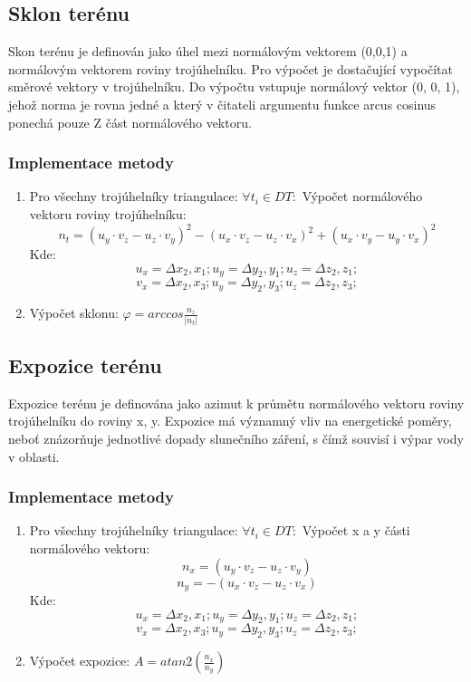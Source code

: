 \documentclass[a4paper, 12pt]{article}
\begin{document}
\subsection{Sklon terénu}
Skon terénu je definován jako úhel mezi normálovým vektorem (0,0,1) a normálovým vektorem roviny trojúhelníku. Pro výpočet je dostačující vypočítat směrové vektory v trojúhelníku. Do výpočtu vstupuje normálový vektor (0, 0, 1), jehož norma je rovna jedné a který v čitateli argumentu funkce arcus cosinus ponechá pouze Z část normálového vektoru.


\subsubsection{Implementace metody}
\begin{enumerate}
\item Pro všechny trojúhelníky triangulace: $ \forall t_i \in DT: $
\subitem Výpočet normálového vektoru roviny trojúhelníku: \\
 $$ n_t = (u_y \cdot v_z - u_z \cdot v_y)^2 - (u_x \cdot v_z - u_z \cdot v_x)^2  + (u_x \cdot v_y - u_y \cdot v_x)^2 $$
\subitem Kde:
$$  u_x = \Delta x_2, x_1; u_y = \Delta y_2, y_1; u_z = \Delta z_2, z_1;$$
$$  v_x = \Delta x_2, x_3; u_y = \Delta y_2, y_3; u_z = \Delta z_2, z_3;$$
\item Výpočet sklonu: $ \varphi = arccos \frac{n_z}{|n_t|} $

\end{enumerate}

\subsection{Expozice terénu}
Expozice terénu je definována jako azimut k průmětu normálového vektoru roviny trojúhelníku do roviny x, y. Expozice má významný vliv na energetické poměry, neboť znázorňuje jednotlivé dopady slunečního záření, s čímž souvisí i výpar vody v oblasti. 

\subsubsection{Implementace metody}
\begin{enumerate}
\item Pro všechny trojúhelníky triangulace: $ \forall t_i \in DT: $
\subitem Výpočet x a y části normálového vektoru: \\
$$ n_x = (u_y \cdot v_z - u_z \cdot v_y) $$
$$ n_y = -(u_x \cdot v_z - u_z \cdot v_x) $$
\subitem Kde:
$$  u_x = \Delta x_2, x_1; u_y = \Delta y_2, y_1; u_z = \Delta z_2, z_1;$$
$$  v_x = \Delta x_2, x_3; u_y = \Delta y_2, y_3; u_z = \Delta z_2, z_3;$$
\item Výpočet expozice: $ A =atan2( \frac{n_x}{n_y}) $
\end{enumerate}
\end{document}
